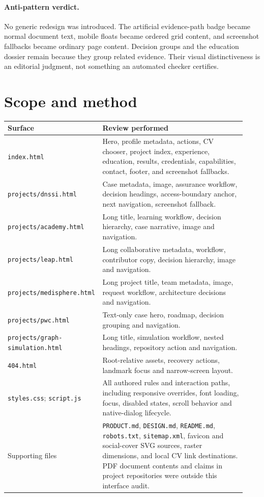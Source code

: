 \documentclass[11pt,a4paper]{article}
\newcommand{\file}[1]{\nolinkurl{#1}}
\begin{document}
\paragraph{Anti-pattern verdict.}
No generic redesign was introduced. The artificial evidence-path badge became normal document text, mobile floats became ordered grid content, and screenshot fallbacks became ordinary page content. Decision groups and the education dossier remain because they group related evidence. Their visual distinctiveness is an editorial judgment, not something an automated checker certifies.

\section{Scope and method}
\begin{longtable}{p{0.33\linewidth}p{0.60\linewidth}}
\toprule
Surface & Review performed \\
\midrule
\endhead
\file{index.html} & Hero, profile metadata, actions, CV chooser, project index, experience, education, results, credentials, capabilities, contact, footer, and screenshot fallbacks. \\
\file{projects/dnssi.html} & Case metadata, image, assurance workflow, decision headings, access-boundary anchor, next navigation, screenshot fallback. \\
\file{projects/academy.html} & Long title, learning workflow, decision hierarchy, case narrative, image and navigation. \\
\file{projects/leap.html} & Long collaborative metadata, workflow, contributor copy, decision hierarchy, image and navigation. \\
\file{projects/medisphere.html} & Long project title, team metadata, image, request workflow, architecture decisions and navigation. \\
\file{projects/pwc.html} & Text-only case hero, roadmap, decision grouping and navigation. \\
\file{projects/graph-simulation.html} & Long title, simulation workflow, nested headings, repository action and navigation. \\
\file{404.html} & Root-relative assets, recovery actions, landmark focus and narrow-screen layout. \\
\file{styles.css}; \file{script.js} & All authored rules and interaction paths, including responsive overrides, font loading, focus, disabled states, scroll behavior and native-dialog lifecycle. \\
Supporting files & \file{PRODUCT.md}, \file{DESIGN.md}, \file{README.md}, \file{robots.txt}, \file{sitemap.xml}, favicon and social-cover SVG sources, raster dimensions, and local CV link destinations. PDF document contents and claims in project repositories were outside this interface audit. \\
\bottomrule
\end{longtable}
\end{document}
